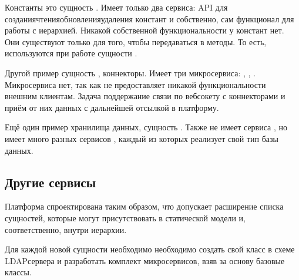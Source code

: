 \documentclass[a4paper,10pt,russian]{sphinxmanual}
\begin{document}
\sphinxAtStartPar
Константы \sphinxhyphen{} это сущность . Имеет только два сервиса:
 \sphinxhyphen{} API для создания\sphinxhyphen{}чтения\sphinxhyphen{}обновления\sphinxhyphen{}удаления констант и
 \sphinxhyphen{} собственно, сам функционал для работы с иерархией.
Никакой собственной функциональности у констант нет. Они существуют только для
того, чтобы передаваться в методы. То есть, используются при работе сущности
.

\sphinxAtStartPar
Другой пример \sphinxhyphen{} сущность , коннекторы. Имеет три микросервиса:
, , .
Микросервиса  нет, так как 
не предоставляет никакой функциональности внешним клиентам. Задача
 \sphinxhyphen{} поддержание связи по веб\sphinxhyphen{}сокету с коннекторами и приём
от них данных с дальнейшей отсылкой в платформу.

\sphinxAtStartPar
Ещё один пример \sphinxhyphen{} хранилища данных, сущность . Также не имеет
сервиса , но имеет много разных сервисов
, каждый из которых реализует свой тип базы данных.




\subsection{Другие сервисы}
\label{\detokenize{architecture:id15}}
\sphinxAtStartPar
Платформа спроектирована таким образом, что допускает расширение списка
сущностей, которые могут присутствовать в статической модели и, соответственно,
внутри иерархии.

\sphinxAtStartPar
Для каждой новой сущности необходимо необходимо создать свой класс в схеме
LDAP\sphinxhyphen{}сервера и разработать комплект микросервисов, взяв за основу базовые
классы.
\end{document}
